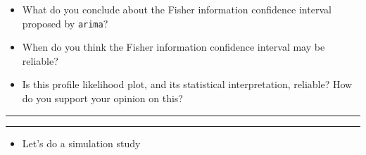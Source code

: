 \documentclass[]{article}
\providecommand{\tightlist}{%
  \setlength{\itemsep}{0pt}\setlength{\parskip}{0pt}}
\begin{document}
\begin{itemize}
\item
  What do you conclude about the Fisher information confidence interval
  proposed by \texttt{arima}?
\item
  When do you think the Fisher information confidence interval may be
  reliable?
\item
  Is this profile likelihood plot, and its statistical interpretation,
  reliable? How do you support your opinion on this?
\end{itemize}


\begin{center}\rule{0.5\linewidth}{\linethickness}\end{center}

\begin{center}\rule{0.5\linewidth}{\linethickness}\end{center}

\begin{itemize}
\tightlist
\item
  Let's do a simulation study
\end{itemize}
\end{document}
